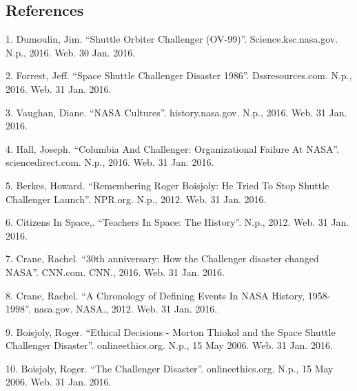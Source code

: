 \documentclass{article}
\newcommand{\q}[1]{``#1''}
\begin{document}
\pagebreak
\begin{center}\section*{References}\end{center}

1. Dumoulin, Jim. \q{Shuttle Orbiter Challenger (OV-99)}. Science.ksc.nasa.gov. N.p., 2016. Web. 30 Jan. 2016. \par

\vspace{5pt}

2. Forrest, Jeff. \q{Space Shuttle Challenger Disaster 1986}. Dssresources.com. N.p., 2016. Web. 31 Jan. 2016. \par

\vspace{5pt}

3. Vaughan, Diane. \q{NASA Cultures}. history.nasa.gov. N.p., 2016. Web. 31 Jan. 2016. \par

\vspace{5pt}

4. Hall, Joseph. \q{Columbia And Challenger: Organizational Failure At NASA}. sciencedirect.com. N.p., 2016. Web. 31 Jan. 2016.\par

\vspace{5pt}

5. Berkes, Howard. \q{Remembering Roger Boisjoly:  He Tried To Stop Shuttle Challenger Launch}. NPR.org. N.p., 2012. Web. 31 Jan. 2016. \par

\vspace{5pt}

6. Citizens In Space,. \q{Teachers In Space: The History}. N.p., 2012. Web. 31 Jan. 2016. \par

\vspace{5pt}

7. Crane, Rachel. \q{30th anniversary: How the Challenger disaster changed NASA}. CNN.com. CNN., 2016. Web. 31 Jan. 2016. \par

\vspace{5pt}

8. Crane, Rachel. \q{A Chronology of Defining Events In NASA History, 1958-1998}. nasa.gov. NASA., 2012. Web. 31 Jan. 2016. \par

\vspace{5pt}

9. Boisjoly, Roger. \q{Ethical Decisions - Morton Thiokol and the Space Shuttle Challenger Disaster}. onlineethics.org. N.p., 15 May 2006. Web. 31 Jan. 2016. \par

\vspace{5pt}

10. Boisjoly, Roger. \q{The Challenger Disaster}. onlineethics.org. N.p., 15 May 2006. Web. 31 Jan. 2016. \par

\vspace{5pt}

\par
\end{document}
